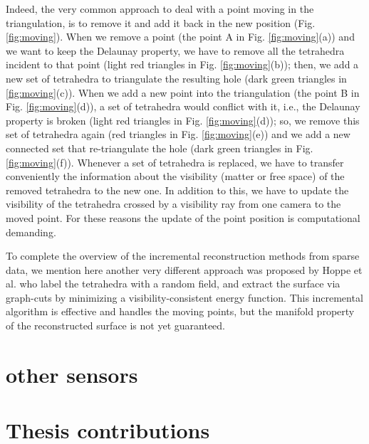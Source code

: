 Indeed, the very common approach to deal with a point moving in the triangulation, is to remove it and add it back in the new position \cite{cgal} (Fig. \ref{fig:moving}). 
When we remove a point (the point A in Fig. \ref{fig:moving}(a)) and we want to keep the Delaunay property, we have to remove all the tetrahedra incident to that point (light red triangles in Fig. \ref{fig:moving}(b)); then, we add a new set of tetrahedra to triangulate the resulting hole (dark green triangles in \ref{fig:moving}(c)).
When we add a new point into the triangulation  (the point B in Fig. \ref{fig:moving}(d)), a set of tetrahedra would conflict with it, i.e., the Delaunay property is broken (light red triangles in Fig. \ref{fig:moving}(d)); so, we remove this set of tetrahedra again (red triangles in Fig. \ref{fig:moving}(e)) and we add a new connected set that re-triangulate the hole (dark green triangles in Fig. \ref{fig:moving}(f)).
Whenever a set of tetrahedra is replaced, we have to transfer conveniently the information about the visibility (matter or free space) of the removed tetrahedra to the new one. 
In addition to this, we have to update the visibility of the tetrahedra crossed by a visibility ray from one camera to the moved point.
For these reasons the update of the point position is computational demanding.

To complete the overview of the incremental reconstruction methods from sparse data, we mention here another very different approach was proposed by Hoppe et al. \cite{Hoppe13} who label the tetrahedra with a random field, and extract the surface via graph-cuts by minimizing a visibility-consistent energy function. This incremental algorithm is effective and handles the moving points, but the manifold property of the reconstructed surface is not yet guaranteed.

\section{other sensors}


\section{Thesis contributions}

